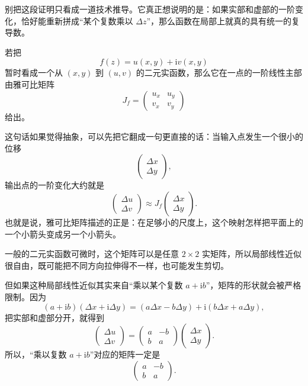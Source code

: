 \begin{tishi}[这一段证明真正想告诉我们什么]
别把这段证明只看成一道技术推导。它真正想说明的是：如果实部和虚部的一阶变化，恰好能重新拼成``某个复数乘以 $\Delta z$''，那么函数在局部上就真的具有统一的复导数。
\end{tishi}

\begin{tishi}[把 C-R 条件看成矩阵条件]
若把
\[
    f(z)=u(x,y)+\mathrm{i}v(x,y)
\]
暂时看成一个从 $(x,y)$ 到 $(u,v)$ 的二元实函数，那么它在一点的一阶线性主部由雅可比矩阵
\[
    J_f=
    \begin{pmatrix}
        u_x & u_y\\
        v_x & v_y
    \end{pmatrix}
\]
给出。

这句话如果觉得抽象，可以先把它翻成一句更直接的话：当输入点发生一个很小的位移
\[
    \begin{pmatrix}
        \Delta x\\
        \Delta y
    \end{pmatrix},
\]
输出点的一阶变化大约就是
\[
    \begin{pmatrix}
        \Delta u\\
        \Delta v
    \end{pmatrix}
    \approx
    J_f
    \begin{pmatrix}
        \Delta x\\
        \Delta y
    \end{pmatrix}.
\]
也就是说，雅可比矩阵描述的正是：在足够小的尺度上，这个映射怎样把平面上的一个小箭头变成另一个小箭头。

一般的二元实函数可微时，这个矩阵可以是任意 $2\times 2$ 实矩阵，所以局部线性近似很自由，既可能把不同方向拉伸得不一样，也可能发生剪切。

但如果这种局部线性近似其实来自``乘以某个复数 $a+\mathrm{i}b$''，矩阵的形状就会被严格限制。因为
\[
    (a+\mathrm{i}b)(\Delta x+\mathrm{i}\Delta y)
    =(a\Delta x-b\Delta y)+\mathrm{i}(b\Delta x+a\Delta y),
\]
把实部和虚部分开，就得到
\[
    \begin{pmatrix}
        \Delta u\\
        \Delta v
    \end{pmatrix}
    =
    \begin{pmatrix}
        a & -b\\
        b & a
    \end{pmatrix}
    \begin{pmatrix}
        \Delta x\\
        \Delta y
    \end{pmatrix}.
\]
所以，``乘以复数 $a+\mathrm{i}b$''对应的矩阵一定是
\[
    \begin{pmatrix}
        a & -b\\
        b & a
    \end{pmatrix}.
\]


\end{tishi}
